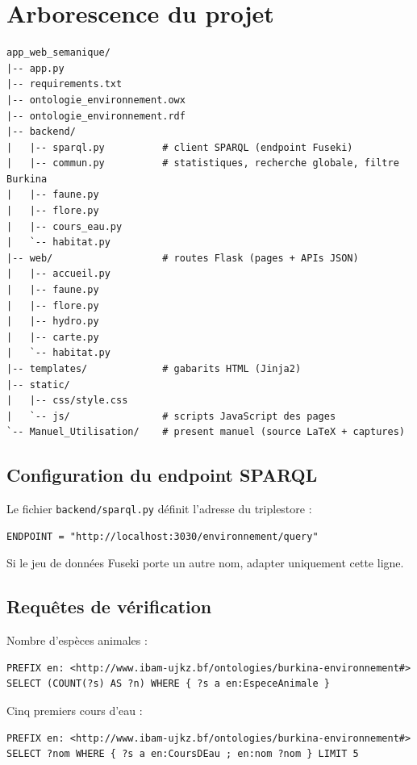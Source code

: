 ﻿\documentclass[12pt,a4paper]{report}
\begin{document}
\appendix
\chapter{Arborescence du projet}

\begin{verbatim}
app_web_semanique/
|-- app.py
|-- requirements.txt
|-- ontologie_environnement.owx
|-- ontologie_environnement.rdf
|-- backend/
|   |-- sparql.py          # client SPARQL (endpoint Fuseki)
|   |-- commun.py          # statistiques, recherche globale, filtre Burkina
|   |-- faune.py
|   |-- flore.py
|   |-- cours_eau.py
|   `-- habitat.py
|-- web/                   # routes Flask (pages + APIs JSON)
|   |-- accueil.py
|   |-- faune.py
|   |-- flore.py
|   |-- hydro.py
|   |-- carte.py
|   `-- habitat.py
|-- templates/             # gabarits HTML (Jinja2)
|-- static/
|   |-- css/style.css
|   `-- js/                # scripts JavaScript des pages
`-- Manuel_Utilisation/    # present manuel (source LaTeX + captures)
\end{verbatim}

\section{Configuration du endpoint SPARQL}

Le fichier \texttt{backend/sparql.py} définit l'adresse du triplestore :

\begin{lstlisting}
ENDPOINT = "http://localhost:3030/environnement/query"
\end{lstlisting}

\noindent Si le jeu de données Fuseki porte un autre nom, adapter uniquement cette ligne.

\section{Requêtes de vérification}

Nombre d'espèces animales :

\begin{lstlisting}
PREFIX en: <http://www.ibam-ujkz.bf/ontologies/burkina-environnement#>
SELECT (COUNT(?s) AS ?n) WHERE { ?s a en:EspeceAnimale }
\end{lstlisting}

Cinq premiers cours d'eau :

\begin{lstlisting}
PREFIX en: <http://www.ibam-ujkz.bf/ontologies/burkina-environnement#>
SELECT ?nom WHERE { ?s a en:CoursDEau ; en:nom ?nom } LIMIT 5
\end{lstlisting}
\end{document}
